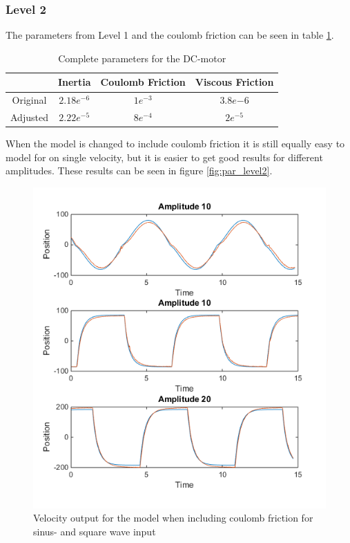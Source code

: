\documentclass[12pt,a4paper]{article}
\begin{document}
\subsubsection*{Level 2}
The parameters from Level 1 and the coulomb friction can be seen in
table \ref{tab:parametersL2}.
\begin{center}
  \begin{table}[H]
    \centering
    \caption{Complete parameters for the DC-motor}
    \begin{tabular}{|c|c|c|c|}
        \hline
        & Inertia & Coulomb Friction & Viscous Friction \\ 
        \hline
        Original & $2.18e^{-6}$ & $1e^{-3}$ & $3.8e{-6}$ \\
        \hline
        Adjusted & $2.22e^{-5}$ & $8e^{-4}$ & $2e^{-5}$ \\
        \hline
    \end{tabular}
   \label{tab:parametersL2}
  \end{table}
\end{center}
When the model is changed to include coulomb friction it is still
equally easy to model for on single velocity, but it is easier to get
good results for different amplitudes. These results can be seen in
figure \ref{fig:par_level2}.
\begin{center}
  \begin{figure}[H]
    \centering
    \includegraphics[scale=0.6]{par_level2.png}
    \caption{Velocity output for the model when including coulomb
    friction for sinus- and square wave input}
    \label{fig:par_level2.png}
    \end{figure}
\end{center}
\end{document}
